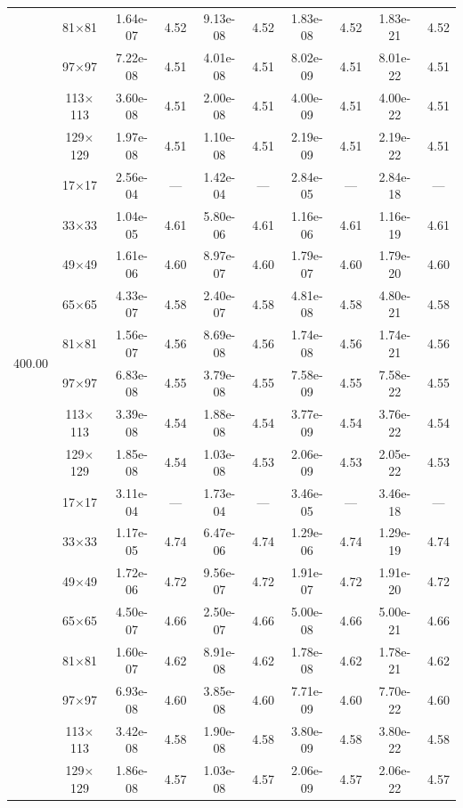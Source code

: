\begin{table}[H]
{\begin{tabular*}{\textwidth}{@{\extracolsep\fill}c|c|cc|cc|cc|cc@{}}
                & 81$\times$81 & 1.64e-07 & 4.52 & 9.13e-08 & 4.52 & 1.83e-08 & 4.52 & 1.83e-21 & 4.52 \\
                & 97$\times$97 & 7.22e-08 & 4.51 & 4.01e-08 & 4.51 & 8.02e-09 & 4.51 & 8.01e-22 & 4.51 \\
                & 113$\times$113 & 3.60e-08 & 4.51 & 2.00e-08 & 4.51 & 4.00e-09 & 4.51 & 4.00e-22 & 4.51 \\
                & 129$\times$129 & 1.97e-08 & 4.51 & 1.10e-08 & 4.51 & 2.19e-09 & 4.51 & 2.19e-22 & 4.51 \\
                \midrule
                \multirow{10}{*}{400.00} & 17$\times$17 & 2.56e-04 & --- & 1.42e-04 & --- & 2.84e-05 & --- & 2.84e-18 & --- \\
                & 33$\times$33 & 1.04e-05 & 4.61 & 5.80e-06 & 4.61 & 1.16e-06 & 4.61 & 1.16e-19 & 4.61 \\
                & 49$\times$49 & 1.61e-06 & 4.60 & 8.97e-07 & 4.60 & 1.79e-07 & 4.60 & 1.79e-20 & 4.60 \\
                & 65$\times$65 & 4.33e-07 & 4.58 & 2.40e-07 & 4.58 & 4.81e-08 & 4.58 & 4.80e-21 & 4.58 \\
                & 81$\times$81 & 1.56e-07 & 4.56 & 8.69e-08 & 4.56 & 1.74e-08 & 4.56 & 1.74e-21 & 4.56 \\
                & 97$\times$97 & 6.83e-08 & 4.55 & 3.79e-08 & 4.55 & 7.58e-09 & 4.55 & 7.58e-22 & 4.55 \\
                & 113$\times$113 & 3.39e-08 & 4.54 & 1.88e-08 & 4.54 & 3.77e-09 & 4.54 & 3.76e-22 & 4.54 \\
                & 129$\times$129 & 1.85e-08 & 4.54 & 1.03e-08 & 4.53 & 2.06e-09 & 4.53 & 2.05e-22 & 4.53 \\
                \midrule
                \multirow{10}{*}{1000.00} & 17$\times$17 & 3.11e-04 & --- & 1.73e-04 & --- & 3.46e-05 & --- & 3.46e-18 & --- \\
                & 33$\times$33 & 1.17e-05 & 4.74 & 6.47e-06 & 4.74 & 1.29e-06 & 4.74 & 1.29e-19 & 4.74 \\
                & 49$\times$49 & 1.72e-06 & 4.72 & 9.56e-07 & 4.72 & 1.91e-07 & 4.72 & 1.91e-20 & 4.72 \\
                & 65$\times$65 & 4.50e-07 & 4.66 & 2.50e-07 & 4.66 & 5.00e-08 & 4.66 & 5.00e-21 & 4.66 \\
                & 81$\times$81 & 1.60e-07 & 4.62 & 8.91e-08 & 4.62 & 1.78e-08 & 4.62 & 1.78e-21 & 4.62 \\
                & 97$\times$97 & 6.93e-08 & 4.60 & 3.85e-08 & 4.60 & 7.71e-09 & 4.60 & 7.70e-22 & 4.60 \\
                & 113$\times$113 & 3.42e-08 & 4.58 & 1.90e-08 & 4.58 & 3.80e-09 & 4.58 & 3.80e-22 & 4.58 \\
                & 129$\times$129 & 1.86e-08 & 4.57 & 1.03e-08 & 4.57 & 2.06e-09 & 4.57 & 2.06e-22 & 4.57 \\
                \bottomrule
            \end{tabular*}
	}{
		\fdadospesquisa
	}
\end{table}

